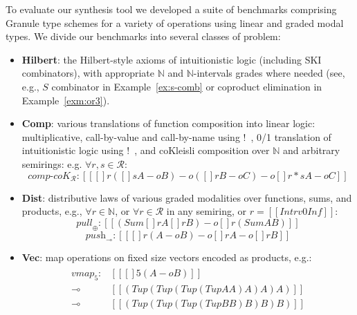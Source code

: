 To evaluate our synthesis tool we developed a suite of benchmarks comprising
Granule type schemes for a variety of operations using linear and graded modal
types. We divide our benchmarks into several classes of problem:
%
\begin{itemize}[itemsep=0em,leftmargin=1.1em]
\item \textbf{Hilbert}: the Hilbert-style axioms of
  intuitionistic logic (including SKI combinators), with appropriate $\mathbb{N}$ and $\mathbb{N}$-intervals
  grades where needed (see, e.g., $S$ combinator in
  Example~\ref{ex:s-comb} or coproduct elimination in Example~\ref{exm:or3}).

\item \textbf{Comp}: various translations of function composition into linear
logic: multiplicative, call-by-value and call-by-name using
$!$~\citep{girard1987linear}, 0/1 translation of intuitionistic logic using
$!$~\citep{liang2009focusing}, and coKleisli composition over $\mathbb{N}$ and
arbitrary semirings: e.g. $\forall r, s \in \mathcal{R}$:
%
\begin{equation*}
\textit{comp-}\textit{coK}_{\mathcal{R}} : [[ {[] r ({[] s A} -o B)} -o {({[] r B} -o C) -o {{[] {r * s} A} -o C}} ]]
\end{equation*}
%
\item \textbf{Dist}: distributive laws of various graded
modalities over functions, sums, and products,
e.g., $\forall r \in \mathbb{N}$, or
$\forall r \in \mathcal{R}$ in any semiring, or $r = [[ Intrv 0 Inf ]]$:
%
\begin{equation*}
\textit{pull}_\oplus : [[ (Sum {[] r A} {[] r B}) -o [] r (Sum A B) ]]
\end{equation*}
\begin{equation*}
\textit{push}_\multimap : [[ {[] r (A -o B)} -o {{[] r A} -o [] r B} ]]
\end{equation*}
%

\item \textbf{Vec}: map operations on
fixed size vectors encoded as products, e.g.:
\begin{align*}
\begin{array}{rl}
\textit{vmap}_5 :& [[ {[] 5 (A -o B)} ]] \\ \multimap & [[(Tup (Tup (Tup (Tup A A) A) A) A) ]] \\ \multimap & [[ (Tup (Tup (Tup (Tup B B) B) B) B) ]]
\end{array}
\end{align*}
%


\end{itemize}

